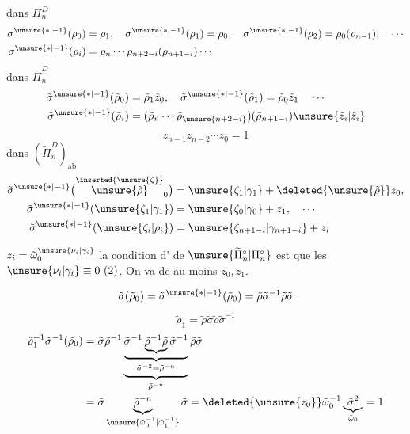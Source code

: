 dans $\Pi_n^D$
\[
\begin{aligned}
\sigma^{\unsure{\ast|-1}}(\rho_0)&=\rho_1,\quad
\sigma^{\unsure{\ast|-1}}(\rho_1)=\rho_0,\quad
\sigma^{\unsure{\ast|-1}}(\rho_2)=\rho_0(\rho_{n-1}),\quad\cdots\\
\sigma^{\unsure{\ast|-1}}(\rho_i)&=\rho_n\cdots\rho_{n+2-i}(\rho_{n+1-i})\cdots
\end{aligned}
\]
dans $\widetilde\Pi_n^D$
\[
\begin{aligned}
\tilde\sigma^{\unsure{\ast|-1}}(\tilde\rho_0)&=\tilde\rho_1\tilde z_0,\quad
\tilde\sigma^{\unsure{\ast|-1}}(\tilde\rho_1)=\tilde\rho_0\tilde z_1\quad\cdots\\
\tilde\sigma^{\unsure{\ast|-1}}(\tilde\rho_i)&=
(\tilde\rho_n\cdots\tilde\rho_{\unsure{n+2-i}})(\tilde\rho_{n+1-i})\unsure{\tilde z_i|\hat z_i}
\end{aligned}
\]
\[
z_{n-1}z_{n-2}\cdots z_0=1
\]
dans $(\widetilde\Pi_n^D)_{\mathrm{ab}}$
\[
\begin{aligned}
\tilde\sigma^{\unsure{\ast|-1}}
\bigl(\overset{\inserted{\unsure{\zeta}}}{\unsure{\tilde\rho}}_0\bigr)
&=\unsure{\zeta_1|\gamma_1}+\deleted{\unsure{\tilde\rho}}z_0,\\
\tilde\sigma^{\unsure{\ast|-1}}(\unsure{\zeta_1|\gamma_1})
&=\unsure{\zeta_0|\gamma_0}+z_1,\quad\cdots\\
\tilde\sigma^{\unsure{\ast|-1}}(\unsure{\zeta_i|\rho_i})
&=\unsure{\zeta_{n+1-i}|\gamma_{n+1-i}}+z_i
\end{aligned}
\]

$z_i=\tilde\omega_0^{\unsure{\nu_i|\gamma_i}}$
la condition d' de $\unsure{\widetilde\Pi_n^\circ|\Pi_n^\circ}$ est
que les $\unsure{\nu_i|\gamma_i}\equiv0\ (2)$.
On va  de   au moins $z_0,z_1$.

\[
\tilde\sigma(\tilde\rho_0)
=\tilde\sigma^{\unsure{\ast|-1}}(\tilde\rho_0)
=\tilde\rho\tilde\sigma^{-1}\tilde\rho\tilde\sigma
\]
\[
\tilde\rho_1=\tilde\rho\tilde\sigma\tilde\rho\tilde\sigma^{-1}
\]
\[
\begin{aligned}
\tilde\rho_1^{-1}\tilde\sigma^{-1}(\tilde\rho_0)
&=\tilde\sigma\tilde\rho^{-1}
\underbrace{\underbrace{\tilde\sigma^{-1}
\underbrace{\tilde\rho^{-1}\tilde\rho}\tilde\sigma^{-1}}_{
\tilde\sigma^{-2}=\tilde\rho^{-n}}}_{\tilde\rho^{-n}}
\tilde\rho\tilde\sigma\\
&=\tilde\sigma\underbrace{\tilde\rho^{-n}}_{
\unsure{\tilde\omega_0^{-1}|\tilde\omega_1^{-1}}}\tilde\sigma
=\deleted{\unsure{z_0}}\tilde\omega_0^{-1}\underbrace{\tilde\sigma^2}_{\tilde\omega_0}=1
\end{aligned}
\]
\margin{\deleted{$\unsure{\tilde\rho}$}}

